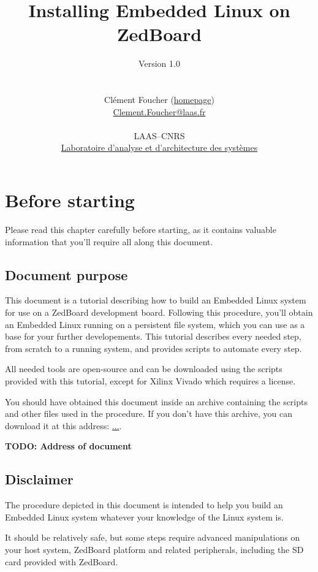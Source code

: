 \documentclass[openany,a4paper]{book}
\title{Installing Embedded Linux on ZedBoard}
\author
{
        Version 1.0\\
        \\
        \\
	Clément Foucher (\href{https://homepages.laas.fr/cfoucher}{homepage})\\
	\href{mailto:Clement.Foucher@laas.fr}{Clement.Foucher@laas.fr}\\
	\\
	LAAS--CNRS\\
	\href{https://www.laas.fr/public/en}{Laboratoire d'analyse et d'architecture des syst\`emes}
}
\begin{document}
\maketitle

\tableofcontents


\chapter{Before starting}

Please read this chapter carefully before starting, as it contains valuable information that you'll require all along this document.

\section{Document purpose}

This document is a tutorial describing how to build an Embedded Linux system for use on a ZedBoard development board.
Following this procedure, you'll obtain an Embedded Linux running on a persistent file system, which you can use as a base for your further developements.
This tutorial describes every needed step, from scratch to a running system, and provides scripts to automate every step.

All needed tools are open-source and can be downloaded using the scripts provided with this tutorial, except for Xilinx Vivado which requires a license.

You should have obtained this document inside an archive containing the scripts and other files used in the procedure.
If you don't have this archive, you can download it at this address: \url{...}.

\textbf{TODO: Address of document}


\section{Disclaimer}

The procedure depicted in this document is intended to help you build an Embedded Linux system whatever your knowledge of the Linux system is.

It should be relatively safe, but some steps require advanced manipulations on your host system, ZedBoard platform and related peripherals, including the SD card provided with ZedBoard.
\end{document}
